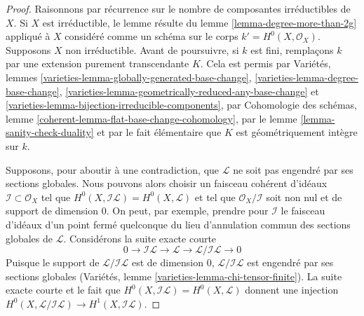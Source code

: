 \begin{proof}
Raisonnons par récurrence sur le nombre de composantes irréductibles de $X$. Si $X$ est irréductible, le lemme résulte du lemme \ref{lemma-degree-more-than-2g} appliqué à $X$ considéré comme un schéma sur le corps $k' = H^0(X, \mathcal{O}_X)$. Supposons $X$ non irréductible. Avant de poursuivre, si $k$ est fini, remplaçons $k$ par une extension purement transcendante $K$. Cela est permis par Variétés, lemmes \ref{varieties-lemma-globally-generated-base-change}, \ref{varieties-lemma-degree-base-change}, \ref{varieties-lemma-geometrically-reduced-any-base-change} et \ref{varieties-lemma-bijection-irreducible-components}, par Cohomologie des schémas, lemme \ref{coherent-lemma-flat-base-change-cohomology}, par le lemme \ref{lemma-sanity-check-duality} et par le fait élémentaire que $K$ est géométriquement intègre sur $k$.

\medskip\noindent
Supposons, pour aboutir à une contradiction, que $\mathcal{L}$ ne soit pas engendré par ses sections globales. Nous pouvons alors choisir un faisceau cohérent d'idéaux $\mathcal{I} \subset \mathcal{O}_X$ tel que $H^0(X, \mathcal{I}\mathcal{L}) = H^0(X, \mathcal{L})$ et tel que $\mathcal{O}_X/\mathcal{I}$ soit non nul et de support de dimension $0$. On peut, par exemple, prendre pour $\mathcal{I}$ le faisceau d'idéaux d'un point fermé quelconque du lieu d'annulation commun des sections globales de $\mathcal{L}$. Considérons la suite exacte courte $$
0 \to \mathcal{I}\mathcal{L} \to \mathcal{L} \to 
\mathcal{L}/\mathcal{I}\mathcal{L} \to 0
$$ Puisque le support de $\mathcal{L}/\mathcal{I}\mathcal{L}$ est de dimension $0$, $\mathcal{L}/\mathcal{I}\mathcal{L}$ est engendré par ses sections globales (Variétés, lemme \ref{varieties-lemma-chi-tensor-finite}). La suite exacte courte et le fait que $H^0(X, \mathcal{I}\mathcal{L}) = H^0(X, \mathcal{L})$ donnent une injection $H^0(X, \mathcal{L}/\mathcal{I}\mathcal{L}) \to H^1(X, \mathcal{I}\mathcal{L})$.


\end{proof}
